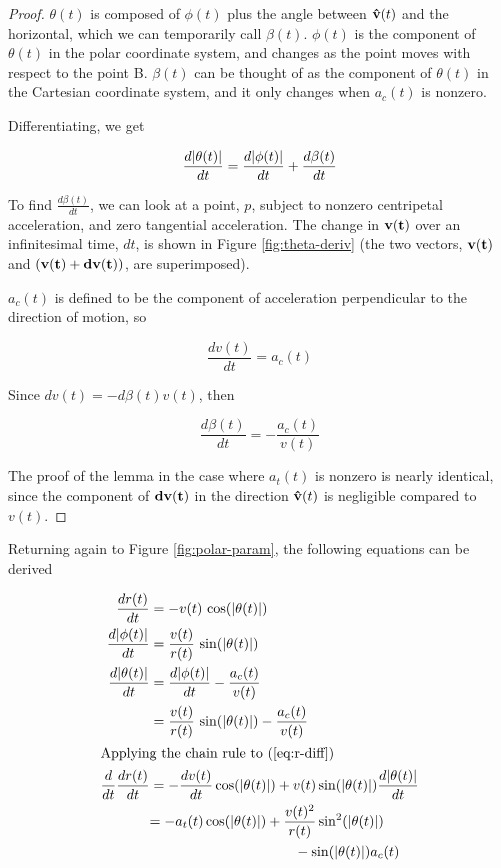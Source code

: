 \begin{proof}

$\theta(t)$ is composed of $\phi(t)$ plus the angle between $\mathbf{\hat{v}}(t)$ and the horizontal, which we can temporarily call $\beta(t)$. $\phi(t)$ is the component of $\theta(t)$ in the polar coordinate system, and changes as the point moves with respect to the point B. $\beta(t)$ can be thought of as the component of $\theta(t)$ in the Cartesian coordinate system, and it only changes when $a_c(t)$ is nonzero. 

Differentiating, we get

\[
\frac{d\abs{\theta(t)}}{dt} = \frac{d\abs{\phi(t)}}{dt} + \frac{d\beta(t)}{dt}
\]

To find $\frac{d\beta(t)}{dt}$, we can look at a point, $p$, subject to nonzero centripetal acceleration, and zero tangential acceleration. The change in $\mathbf{v(t)}$ over an infinitesimal time, $dt$, is shown in Figure \ref{fig:theta-deriv} (the two vectors, $\mathbf{v(t)}$ and $\paren{\bvec{v(t)}+\bvec{dv(t)}}$, are superimposed). 


$a_c(t)$ is defined to be the component of acceleration perpendicular to the direction of motion, so

\[
\frac{dv(t)}{dt} = a_c(t)
\]

Since $dv(t) = -d\beta(t) v(t)$, then

\[
\frac{d\beta(t)}{dt} = -\frac{a_c(t)}{v(t)}
\]

The proof of the lemma in the case where $a_t(t)$ is nonzero is nearly identical, since the component of $\mathbf{dv(t)}$ in the direction $\mathbf{\hat{v}}(t)$ is negligible compared to $v(t)$.

\end{proof}

Returning again to Figure \ref{fig:polar-param}, the following equations can be derived

\begin{align}
  \frac{dr(t)}{dt}& = -v(t) \, \cos\paren{\abs{\theta(t)}}\label{eq:r-diff}\\
  \frac{d\abs{\phi(t)}}{dt}& = \frac{v(t)}{r(t)} \, \sin\paren{\abs{\theta(t)}}\label{eq:phi-diff}\\
  \frac{d\abs{\theta(t)}}{dt}& = \frac{d\abs{\phi(t)}}{dt} - \frac{a_c(t)}{v(t)}\\
  &= \frac{v(t)}{r(t)} \, \sin\paren{\abs{\theta(t)}} - \frac{a_c(t)}{v(t)}\label{eq:theta-diff}\\
  \intertext{Applying the chain rule to (\ref{eq:r-diff})}
  \frac{d}{dt} \frac{dr(t)}{dt}& = -\frac{dv(t)}{dt} \cos\paren{\abs{\theta(t)}} + v(t) \sin\paren{\abs{\theta(t)}} \frac{d\abs{\theta(t)}}{dt}\\
  &\begin{aligned}
    = -a_t(t) \cos\paren{\abs{\theta(t)}} &+ \frac{v(t)^2}{r(t)} \sin^2\paren{\abs{\theta(t)}}\\
    &\qquad - \sin\paren{\abs{\theta(t)}} a_c(t) \label{eq:r-diff-2}
  \end{aligned}
\end{align}
